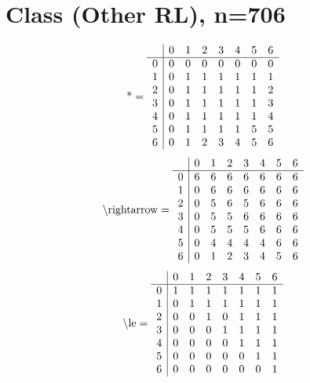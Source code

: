 \documentclass[11pt]{article}
\begin{document}
\section{Class (Other RL), n=706}
\[\text{*} = 
\begin{array}{r | r r r r r r r}
 & 0 & 1 & 2 & 3 & 4 & 5 & 6 \\ \hline
0 & 0 & 0 & 0 & 0 & 0 & 0 & 0 \\
1 & 0 & 1 & 1 & 1 & 1 & 1 & 1 \\
2 & 0 & 1 & 1 & 1 & 1 & 1 & 2 \\
3 & 0 & 1 & 1 & 1 & 1 & 1 & 3 \\
4 & 0 & 1 & 1 & 1 & 1 & 1 & 4 \\
5 & 0 & 1 & 1 & 1 & 1 & 5 & 5 \\
6 & 0 & 1 & 2 & 3 & 4 & 5 & 6 \\
\end{array}
\]
\[\text{\textbackslash rightarrow} = 
\begin{array}{r | r r r r r r r}
 & 0 & 1 & 2 & 3 & 4 & 5 & 6 \\ \hline
0 & 6 & 6 & 6 & 6 & 6 & 6 & 6 \\
1 & 0 & 6 & 6 & 6 & 6 & 6 & 6 \\
2 & 0 & 5 & 6 & 5 & 6 & 6 & 6 \\
3 & 0 & 5 & 5 & 6 & 6 & 6 & 6 \\
4 & 0 & 5 & 5 & 5 & 6 & 6 & 6 \\
5 & 0 & 4 & 4 & 4 & 4 & 6 & 6 \\
6 & 0 & 1 & 2 & 3 & 4 & 5 & 6 \\
\end{array}
\]
\[\text{\textbackslash le} = 
\begin{array}{r | r r r r r r r}
 & 0 & 1 & 2 & 3 & 4 & 5 & 6 \\ \hline
0 & 1 & 1 & 1 & 1 & 1 & 1 & 1 \\
1 & 0 & 1 & 1 & 1 & 1 & 1 & 1 \\
2 & 0 & 0 & 1 & 0 & 1 & 1 & 1 \\
3 & 0 & 0 & 0 & 1 & 1 & 1 & 1 \\
4 & 0 & 0 & 0 & 0 & 1 & 1 & 1 \\
5 & 0 & 0 & 0 & 0 & 0 & 1 & 1 \\
6 & 0 & 0 & 0 & 0 & 0 & 0 & 1 \\
\end{array}
\]
\end{document}
